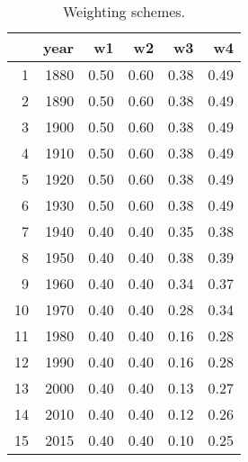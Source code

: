 \documentclass[11pt]{article}\usepackage[]{graphicx}\usepackage[]{color}
\begin{document}
\begin{table}[ht]
\centering
\begin{tabular}{rrrrrr}
  \hline
 & year & w1 & w2 & w3 & w4 \\ 
  \hline
1 & 1880 & 0.50 & 0.60 & 0.38 & 0.49 \\ 
  2 & 1890 & 0.50 & 0.60 & 0.38 & 0.49 \\ 
  3 & 1900 & 0.50 & 0.60 & 0.38 & 0.49 \\ 
  4 & 1910 & 0.50 & 0.60 & 0.38 & 0.49 \\ 
  5 & 1920 & 0.50 & 0.60 & 0.38 & 0.49 \\ 
  6 & 1930 & 0.50 & 0.60 & 0.38 & 0.49 \\ 
  7 & 1940 & 0.40 & 0.40 & 0.35 & 0.38 \\ 
  8 & 1950 & 0.40 & 0.40 & 0.38 & 0.39 \\ 
  9 & 1960 & 0.40 & 0.40 & 0.34 & 0.37 \\ 
  10 & 1970 & 0.40 & 0.40 & 0.28 & 0.34 \\ 
  11 & 1980 & 0.40 & 0.40 & 0.16 & 0.28 \\ 
  12 & 1990 & 0.40 & 0.40 & 0.16 & 0.28 \\ 
  13 & 2000 & 0.40 & 0.40 & 0.13 & 0.27 \\ 
  14 & 2010 & 0.40 & 0.40 & 0.12 & 0.26 \\ 
  15 & 2015 & 0.40 & 0.40 & 0.10 & 0.25 \\ 
   \hline
\end{tabular}
\caption{Weighting schemes.} 
\end{table}
\end{document}
